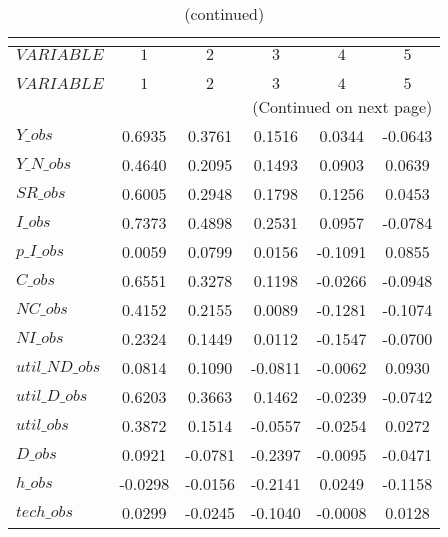  
\begin{center}
\begin{longtable}{lccccc} 
\caption{AUTOCORRELATION OF SIMULATED VARIABLES}\\
 \label{Table:sim_autocorr_matrix}\\
\toprule 
$VARIABLE       $	 & 	 $          1$	 & 	 $          2$	 & 	 $          3$	 & 	 $          4$	 & 	 $          5$\\
\midrule \endfirsthead 
\caption{(continued)}\\
 \toprule \\ 
$VARIABLE       $	 & 	 $          1$	 & 	 $          2$	 & 	 $          3$	 & 	 $          4$	 & 	 $          5$\\
\midrule \endhead 
\midrule \multicolumn{6}{r}{(Continued on next page)} \\ \bottomrule \endfoot 
\bottomrule \endlastfoot 
$Y\_obs         $	 & 	     0.6935	 & 	     0.3761	 & 	     0.1516	 & 	     0.0344	 & 	    -0.0643 \\ 
$Y\_N\_obs      $	 & 	     0.4640	 & 	     0.2095	 & 	     0.1493	 & 	     0.0903	 & 	     0.0639 \\ 
$SR\_obs        $	 & 	     0.6005	 & 	     0.2948	 & 	     0.1798	 & 	     0.1256	 & 	     0.0453 \\ 
$I\_obs         $	 & 	     0.7373	 & 	     0.4898	 & 	     0.2531	 & 	     0.0957	 & 	    -0.0784 \\ 
$p\_I\_obs      $	 & 	     0.0059	 & 	     0.0799	 & 	     0.0156	 & 	    -0.1091	 & 	     0.0855 \\ 
$C\_obs         $	 & 	     0.6551	 & 	     0.3278	 & 	     0.1198	 & 	    -0.0266	 & 	    -0.0948 \\ 
$NC\_obs        $	 & 	     0.4152	 & 	     0.2155	 & 	     0.0089	 & 	    -0.1281	 & 	    -0.1074 \\ 
$NI\_obs        $	 & 	     0.2324	 & 	     0.1449	 & 	     0.0112	 & 	    -0.1547	 & 	    -0.0700 \\ 
$util\_ND\_obs  $	 & 	     0.0814	 & 	     0.1090	 & 	    -0.0811	 & 	    -0.0062	 & 	     0.0930 \\ 
$util\_D\_obs   $	 & 	     0.6203	 & 	     0.3663	 & 	     0.1462	 & 	    -0.0239	 & 	    -0.0742 \\ 
$util\_obs      $	 & 	     0.3872	 & 	     0.1514	 & 	    -0.0557	 & 	    -0.0254	 & 	     0.0272 \\ 
$D\_obs         $	 & 	     0.0921	 & 	    -0.0781	 & 	    -0.2397	 & 	    -0.0095	 & 	    -0.0471 \\ 
$h\_obs         $	 & 	    -0.0298	 & 	    -0.0156	 & 	    -0.2141	 & 	     0.0249	 & 	    -0.1158 \\ 
$tech\_obs      $	 & 	     0.0299	 & 	    -0.0245	 & 	    -0.1040	 & 	    -0.0008	 & 	     0.0128 \\ 
\end{longtable}
 \end{center}
